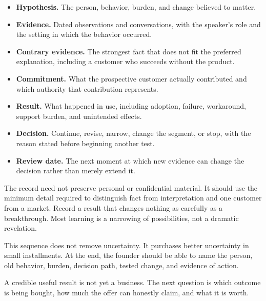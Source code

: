 \begin{itemize}[leftmargin=1.5em,itemsep=0.15em]
\item \textbf{Hypothesis.} The person, behavior, burden, and change believed to
  matter.
\item \textbf{Evidence.} Dated observations and conversations, with the speaker's role
  and the setting in which the behavior occurred.
\item \textbf{Contrary evidence.} The strongest fact that does not fit the preferred
  explanation, including a customer who succeeds without the product.
\item \textbf{Commitment.} What the prospective customer actually contributed and which
  authority that contribution represents.
\item \textbf{Result.} What happened in use, including adoption, failure, workaround,
  support burden, and unintended effects.
\item \textbf{Decision.} Continue, revise, narrow, change the segment, or stop, with the
  reason stated before beginning another test.
\item \textbf{Review date.} The next moment at which new evidence can change the
  decision rather than merely extend it.
\end{itemize}

The record need not preserve personal or confidential material. It should use
the minimum detail required to distinguish fact from interpretation and one
customer from a market. Record a result that changes nothing as carefully as a
breakthrough. Most learning is a narrowing of possibilities, not a dramatic
revelation.

This sequence does not remove uncertainty. It purchases better uncertainty in
small installments. At the end, the founder should be able to name the person,
old behavior, burden, decision path, tested change, and evidence of action.

A credible useful result is not yet a business. The next question is which
outcome is being bought, how much the offer can honestly claim, and what it is
worth.
